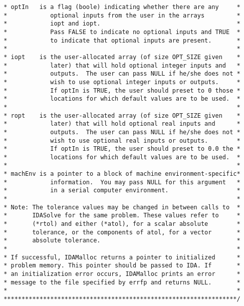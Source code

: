 \begin{verbatim}
 * optIn   is a flag (boole) indicating whether there are any     *
 *            optional inputs from the user in the arrays         *
 *            iopt and iopt.                                      *
 *            Pass FALSE to indicate no optional inputs and TRUE  *
 *            to indicate that optional inputs are present.       *
 *                                                                *
 * iopt    is the user-allocated array (of size OPT_SIZE given    *
 *            later) that will hold optional integer inputs and   *
 *            outputs.  The user can pass NULL if he/she does not *
 *            wish to use optional integer inputs or outputs.     *
 *            If optIn is TRUE, the user should preset to 0 those *
 *            locations for which default values are to be used.  *
 *                                                                *
 * ropt    is the user-allocated array (of size OPT_SIZE given    *
 *            later) that will hold optional real inputs and      *
 *            outputs.  The user can pass NULL if he/she does not *
 *            wish to use optional real inputs or outputs.        *
 *            If optIn is TRUE, the user should preset to 0.0 the *
 *            locations for which default values are to be used.  *
 *                                                                *
 * machEnv is a pointer to a block of machine environment-specific*
 *            information.  You may pass NULL for this argument   *
 *            in a serial computer environment.                   *
 *                                                                *
 * Note: The tolerance values may be changed in between calls to  *
 *       IDASolve for the same problem. These values refer to     *
 *       (*rtol) and either (*atol), for a scalar absolute        *
 *       tolerance, or the components of atol, for a vector       *
 *       absolute tolerance.                                      *
 *                                                                * 
 * If successful, IDAMalloc returns a pointer to initialized      *
 * problem memory. This pointer should be passed to IDA. If       *
 * an initialization error occurs, IDAMalloc prints an error      *
 * message to the file specified by errfp and returns NULL.       *
 *                                                                *
 *****************************************************************/
 
\end{verbatim}
\normalsize


